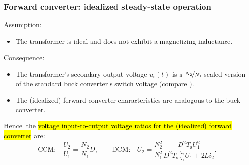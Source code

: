 \begin{frame}
    \frametitle{Forward converter: idealized steady-state operation}
    Assumption:
    \begin{itemize}
        \item The transformer is ideal and does not exhibit a magnetizing inductance.
    \end{itemize}\pause
    Consequence:
    \begin{itemize}
        \item The transformer's secondary output voltage $u_\mathrm{s}(t)$ is a $\nicefrac{N_2}{N_1}$ scaled version of the standard buck converter's switch voltage (compare ). \pause
        \item The (idealized) forward converter characteristics are analogous to the buck converter.
    \end{itemize} \pause
    Hence, the \hl{voltage input-to-output voltage ratios for the (idealized) forward converter} are:
    \begin{equation}
        \mbox{CCM:}\quad \frac{U_2}{U_1} = \frac{N_2}{N_1}D, \qquad \mbox{DCM:}\quad U_2 = \frac{N_2^2}{N_1^2}\frac{D^2T_\mathrm{s}U_1^2}{D^2T_\mathrm{s}\frac{N_2}{N_1}U_1+2L\overline{i}_2}.
    \end{equation}
\end{frame}

